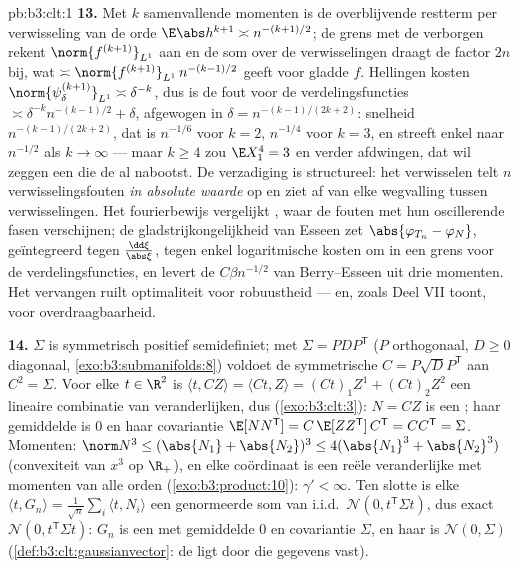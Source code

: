 \begin{solution}{pb:b3:clt:1}
\textbf{13.} Met $k$ samenvallende momenten is de
overblijvende restterm per verwisseling van de orde
$\E\abs h^{k+1} \asymp n^{-(k+1)/2}$; de grens met de
verborgen  rekent $\norm{f^{(k+1)}}_{L^1}$ aan en
de som over de verwisselingen draagt de factor $2n$ bij,
wat $\asymp\norm{f^{(k+1)}}_{L^1}\, n^{-(k-1)/2}$ geeft
voor gladde $f$. Hellingen kosten
$\norm{\psi_\delta^{(k+1)}}_{L^1} \asymp \delta^{-k}$, dus
is de fout voor de verdelingsfuncties $\asymp
\delta^{-k}n^{-(k-1)/2} + \delta$, afgewogen in $\delta =
n^{-(k-1)/(2k+2)}$: snelheid $n^{-(k-1)/(2k+2)}$, dat is
$n^{-1/6}$ voor $k = 2$, $n^{-1/4}$ voor $k = 3$, en
streeft enkel naar $n^{-1/2}$ als $k \to \infty$ --- maar
$k \geq 4$ zou $\E X_1^4 = 3$ en verder afdwingen, dat wil
zeggen een  die de  al nabootst. De
verzadiging is structureel: het verwisselen telt $n$
verwisselingsfouten \emph{in absolute waarde} op en ziet af
van elke wegvalling tussen verwisselingen. Het
fourierbewijs vergelijkt , waar de
fouten met hun oscillerende fasen verschijnen; de
gladstrijkongelijkheid van Esseen zet $\abs{\varphi_{T_n} -
\varphi_N}$, geïntegreerd tegen $\frac{\dd\xi}{\abs\xi}$,
tegen enkel logaritmische kosten om in een grens voor de
verdelingsfuncties, en levert de $C\beta n^{-1/2}$ van
Berry--Esseen uit drie momenten. Het vervangen ruilt
optimaliteit voor robuustheid --- en, zoals Deel VII toont,
voor overdraagbaarheid.

\textbf{14.} $\Sigma$ is symmetrisch positief
semidefiniet; met $\Sigma = PDP^{\mathsf T}$ ($P$
orthogonaal, $D \geq 0$ diagonaal,
\cref{exo:b3:submanifolds:8}) voldoet de symmetrische $C =
P\sqrt DP^{\mathsf T}$ aan $C^2 = \Sigma$. Voor elke $t \in
\R^2$ is $\langle t, CZ\rangle = \langle Ct, Z\rangle =
(Ct)_1Z^1 + (Ct)_2Z^2$ een lineaire combinatie van
  veranderlijken, dus 
(\cref{exo:b3:clt:3}): $N = CZ$ is een ;
haar gemiddelde is $0$ en haar covariantie $\E[NN^{\mathsf
T}] = C\,\E[ZZ^{\mathsf T}]\,C^{\mathsf T} = CC^{\mathsf T}
= \Sigma$. Momenten: $\norm N^3 \leq (\abs{N_1} +
\abs{N_2})^3 \leq 4(\abs{N_1}^3 + \abs{N_2}^3)$ (convexiteit
van $x^3$ op $\R_+$), en elke coördinaat is een reële
 veranderlijke met momenten van alle orden
(\cref{exo:b3:product:10}): $\gamma' < \infty$. Ten slotte
is elke $\langle t, G_n\rangle = \frac1{\sqrt
n}\sum_i\langle t, N_i\rangle$ een genormeerde som van
i.i.d.\ $\mathcal N(0, t^{\mathsf T}\Sigma t)$, dus exact
$\mathcal N(0, t^{\mathsf T}\Sigma t)$: $G_n$ is een
 met gemiddelde $0$ en covariantie
$\Sigma$, en haar  is $\mathcal N(0, \Sigma)$
(\cref{def:b3:clt:gaussianvector}: de  ligt door
die gegevens vast).


\end{solution}
